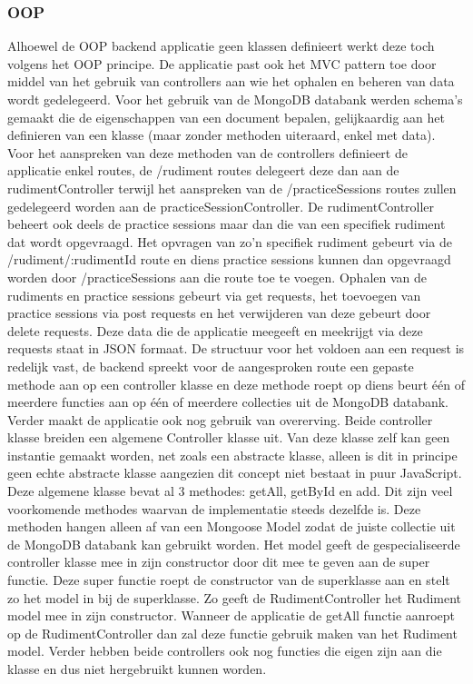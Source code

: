 \subsubsection{OOP}
Alhoewel de OOP backend applicatie geen klassen definieert werkt deze toch volgens het OOP principe. De applicatie past ook het MVC pattern toe door middel van het gebruik van controllers aan wie het ophalen en beheren van data wordt gedelegeerd. Voor het gebruik van de MongoDB databank werden schema's gemaakt die de eigenschappen van een document bepalen, gelijkaardig aan het definieren van een klasse (maar zonder methoden uiteraard, enkel met data). Voor het aanspreken van deze methoden van de controllers definieert de applicatie enkel routes, de /rudiment routes delegeert deze dan aan de rudimentController terwijl het aanspreken van de /practiceSessions routes zullen gedelegeerd worden aan de practiceSessionController. De rudimentController beheert ook deels de practice sessions maar dan die van een specifiek rudiment dat wordt opgevraagd. Het opvragen van zo'n specifiek rudiment gebeurt via de /rudiment/:rudimentId route en diens practice sessions kunnen dan opgevraagd worden door /practiceSessions aan die route toe te voegen. Ophalen van de rudiments en practice sessions gebeurt via get requests, het toevoegen van practice sessions via post requests en het verwijderen van deze gebeurt door delete requests. Deze data die de applicatie meegeeft en meekrijgt via deze requests staat in JSON formaat. De structuur voor het voldoen aan een request is redelijk vast, de backend spreekt voor de aangesproken route een gepaste methode aan op een controller klasse en deze methode roept op diens beurt één of meerdere functies aan op één of meerdere collecties uit de MongoDB databank. Verder maakt de applicatie ook nog gebruik van overerving. Beide controller klasse breiden een algemene Controller klasse uit. Van deze klasse zelf kan geen instantie gemaakt worden, net zoals een abstracte klasse, alleen is dit in principe geen echte abstracte klasse aangezien dit concept niet bestaat in puur JavaScript. Deze algemene klasse bevat al 3 methodes: getAll, getById en add. Dit zijn veel voorkomende methodes waarvan de implementatie steeds dezelfde is. Deze methoden hangen alleen af van een Mongoose Model zodat de juiste collectie uit de MongoDB databank kan gebruikt worden. Het model geeft de gespecialiseerde controller klasse mee in zijn constructor door dit mee te geven aan de super functie. Deze super functie roept de constructor van de superklasse aan en stelt zo het model in bij de superklasse. Zo geeft de RudimentController het Rudiment model mee in zijn constructor. Wanneer de applicatie de getAll functie aanroept op de RudimentController dan zal deze functie gebruik maken van het Rudiment model. Verder hebben beide controllers ook nog functies die eigen zijn aan die klasse en dus niet hergebruikt kunnen worden.

